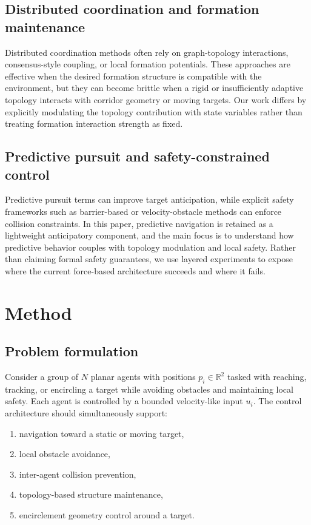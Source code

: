 \documentclass[utf8]{FrontiersinHarvard}
\begin{document}
\subsection{Distributed coordination and formation maintenance}

Distributed coordination methods often rely on graph-topology interactions, consensus-style coupling, or local formation potentials. These approaches are effective when the desired formation structure is compatible with the environment, but they can become brittle when a rigid or insufficiently adaptive topology interacts with corridor geometry or moving targets. Our work differs by explicitly modulating the topology contribution with state variables rather than treating formation interaction strength as fixed.

\subsection{Predictive pursuit and safety-constrained control}

Predictive pursuit terms can improve target anticipation, while explicit safety frameworks such as barrier-based or velocity-obstacle methods can enforce collision constraints. In this paper, predictive navigation is retained as a lightweight anticipatory component, and the main focus is to understand how predictive behavior couples with topology modulation and local safety. Rather than claiming formal safety guarantees, we use layered experiments to expose where the current force-based architecture succeeds and where it fails.

\section{Method}

\subsection{Problem formulation}

Consider a group of $N$ planar agents with positions $p_i \in \mathbb{R}^2$ tasked with reaching, tracking, or encircling a target while avoiding obstacles and maintaining local safety. Each agent is controlled by a bounded velocity-like input $u_i$. The control architecture should simultaneously support:

\begin{enumerate}
    \item navigation toward a static or moving target,
    \item local obstacle avoidance,
    \item inter-agent collision prevention,
    \item topology-based structure maintenance,
    \item encirclement geometry control around a target.
\end{enumerate}
\end{document}
